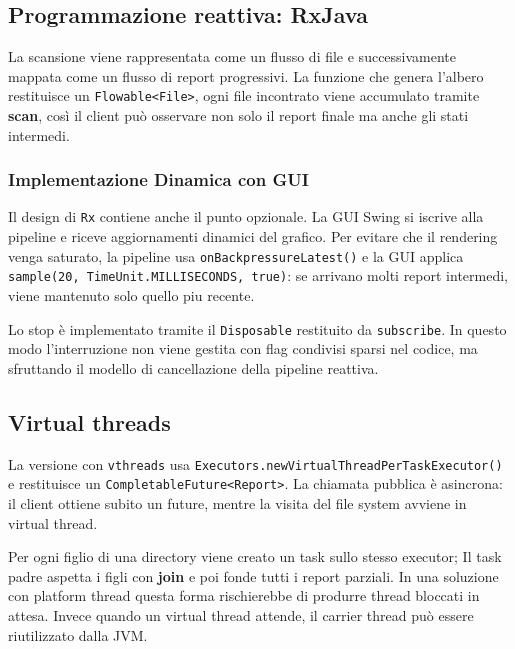 \subsection{Programmazione reattiva: RxJava}
\label{sec:rx}
La scansione viene rappresentata come un flusso di file e successivamente mappata come un flusso di report progressivi. La funzione che genera l'albero restituisce un \texttt{Flowable<File>}, ogni file incontrato viene accumulato tramite \textbf{scan}, così il client può osservare non solo il report finale ma anche gli stati intermedi.

\subsubsection{Implementazione Dinamica con GUI}
Il design di \texttt{Rx} contiene anche il punto opzionale. La GUI Swing si iscrive alla pipeline e riceve aggiornamenti dinamici del grafico. Per evitare che il rendering venga saturato, la pipeline usa \texttt{onBackpressureLatest()} e la GUI applica \texttt{sample(20, TimeUnit.MILLISECONDS, true)}: se arrivano molti report intermedi, viene mantenuto solo quello piu recente.

Lo stop è implementato tramite il \texttt{Disposable} restituito da \texttt{subscribe}. In questo modo l'interruzione non viene gestita con flag condivisi sparsi nel codice, ma sfruttando il modello di cancellazione della pipeline reattiva.

\subsection{Virtual threads}
La versione con \texttt{vthreads} usa \texttt{Executors.newVirtualThreadPerTaskExecutor()} e restituisce un \texttt{CompletableFuture<Report>}. La chiamata pubblica è asincrona: il client ottiene subito un future, mentre la visita del file system avviene in virtual thread.

Per ogni figlio di una directory viene creato un task sullo stesso executor; Il task padre aspetta i figli con \textbf{join} e poi fonde tutti i report parziali. In una soluzione con platform thread questa forma rischierebbe di produrre thread bloccati in attesa. Invece quando un virtual thread attende, il carrier thread può essere riutilizzato dalla JVM.
